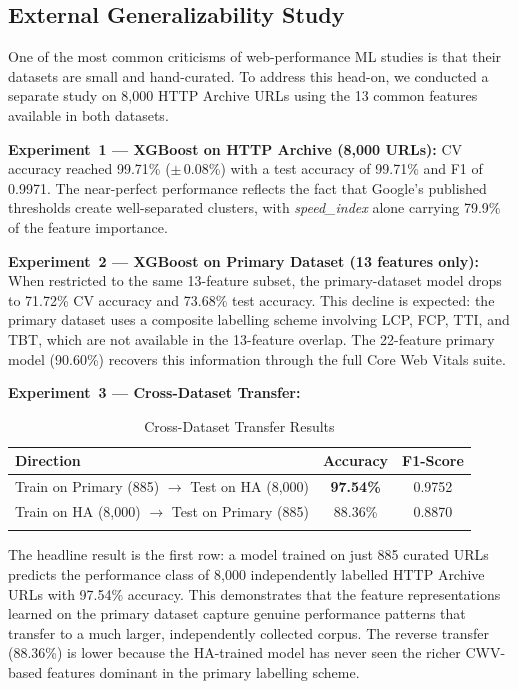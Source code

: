 \documentclass[sn-nature]{sn-jnl}
\begin{document}
\subsection{External Generalizability Study}

One of the most common criticisms of web-performance ML studies is that their datasets are small and hand-curated. To address this head-on, we conducted a separate study on 8,000 HTTP Archive URLs using the 13 common features available in both datasets.

\textbf{Experiment~1 --- XGBoost on HTTP Archive (8,000 URLs):} CV accuracy reached 99.71\% ($\pm$\,0.08\%) with a test accuracy of 99.71\% and F1 of 0.9971. The near-perfect performance reflects the fact that Google's published thresholds create well-separated clusters, with \textit{speed\_index} alone carrying 79.9\% of the feature importance.

\textbf{Experiment~2 --- XGBoost on Primary Dataset (13 features only):} When restricted to the same 13-feature subset, the primary-dataset model drops to 71.72\% CV accuracy and 73.68\% test accuracy. This decline is expected: the primary dataset uses a composite labelling scheme involving LCP, FCP, TTI, and TBT, which are not available in the 13-feature overlap. The 22-feature primary model (90.60\%) recovers this information through the full Core Web Vitals suite.

\textbf{Experiment~3 --- Cross-Dataset Transfer:}

\begin{table}[htbp]
\caption{Cross-Dataset Transfer Results}\label{tab:cross_dataset}
\centering
\begin{tabular}{l c c}
\toprule
Direction & Accuracy & F1-Score \\
\midrule
Train on Primary (885) $\rightarrow$ Test on HA (8,000) & \textbf{97.54\%} & 0.9752 \\
Train on HA (8,000) $\rightarrow$ Test on Primary (885) & 88.36\% & 0.8870 \\
\botrule
\end{tabular}
\end{table}

The headline result is the first row: a model trained on just 885 curated URLs predicts the performance class of 8,000 independently labelled HTTP Archive URLs with 97.54\% accuracy. This demonstrates that the feature representations learned on the primary dataset capture genuine performance patterns that transfer to a much larger, independently collected corpus. The reverse transfer (88.36\%) is lower because the HA-trained model has never seen the richer CWV-based features dominant in the primary labelling scheme.
\end{document}
